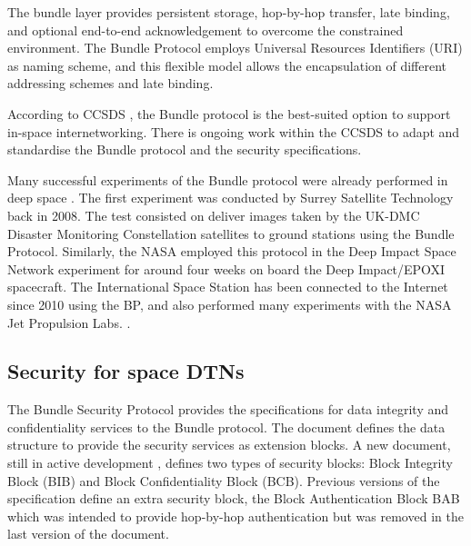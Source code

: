 The bundle layer provides persistent storage, hop-by-hop transfer, late binding, and optional end-to-end acknowledgement to overcome the constrained environment. The Bundle Protocol employs Universal Resources Identifiers (URI) as naming scheme, and this flexible model allows the encapsulation of different addressing schemes and late binding. 

According to CCSDS \cite{rationale2010requirements}, the Bundle protocol is the best-suited option to support in-space internetworking. There is ongoing work within the CCSDS to adapt and standardise the Bundle protocol and the security specifications. %

Many successful experiments of the Bundle protocol were already performed in deep space  \cite{ivancic2010experience}. The first experiment was conducted by Surrey Satellite Technology back in 2008. The test consisted on deliver images taken by the UK-DMC Disaster Monitoring Constellation satellites to ground stations using the Bundle Protocol. Similarly, the NASA employed this protocol in the Deep Impact Space Network experiment for around four weeks on board the Deep Impact/EPOXI spacecraft. The International Space Station has been connected to the Internet since 2010 using the BP, and also performed many experiments with the NASA Jet Propulsion Labs. \cite{araniti2015contact}.    


\subsection{Security for space DTNs}


 
 
The Bundle Security Protocol \cite{rfc6257} provides the specifications for data integrity and confidentiality services to the Bundle protocol. The document defines the data structure to provide the security services as extension blocks. A new document, still in active development \cite{ietf-dtn-bpsec-07}, defines two types of security blocks: Block Integrity Block (BIB) and Block Confidentiality Block (BCB). Previous versions of the specification define an extra security block, the Block Authentication Block BAB which was intended to provide hop-by-hop authentication but was removed in the last version of the document.     
 

